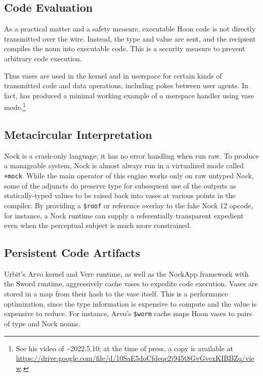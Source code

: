 \documentclass[twoside]{article}
\begin{document}
\subsection{Code Evaluation}

As a practical matter and a safety measure, executable Hoon code is not directly transmitted over the wire.  Instead, the type and value are sent, and the recipient compiles the noun into executable code.  This is a security measure to prevent arbitrary code execution.

Thus vases are used in the kernel and in userspace for certain kinds of transmitted code and data operations, including pokes between user agents.  In fact,  has produced a minimal working example of a userspace handler using vase mode.\footnote{See his video of \textasciitilde 2022.5.10; at the time of press, a copy is available at \\ \url{https://drive.google.com/file/d/10SaE5doCfdeqc2j945t8GvGvexKIBBZq/view}.}

\subsection{Metacircular Interpretation}

Nock is a crash-only language; it has no error handling when run raw.  To produce a manageable system, Nock is almost always run in a virtualized mode called \lstinline[style=inlinecode]{+mock}.  While the main operator of this engine works only on raw untyped Nock, some of the adjuncts do preserve type for subsequent use of the outputs as statically-typed values to be raised back into vases at various points in the compiler.  By providing a \texttt{\$roof} or reference overlay to the fake Nock 12 opcode, for instance, a Nock runtime can supply a referentially transparent expedient even when the perceptual subject is much more constrained.

\subsection{Persistent Code Artifacts}

Urbit's Arvo kernel and Vere runtime, as well as the NockApp framework with the Sword runtime, aggressively cache vases to expedite code execution.  Vases are stored in a map from their hash to the vase itself.  This is a performance optimization, since the type information is expensive to compute and the value is expensive to reduce.  For instance, Arvo's \lstinline[style=inlinecode]{$worm} cache maps Hoon vases to pairs of type and Nock nouns.
\end{document}
